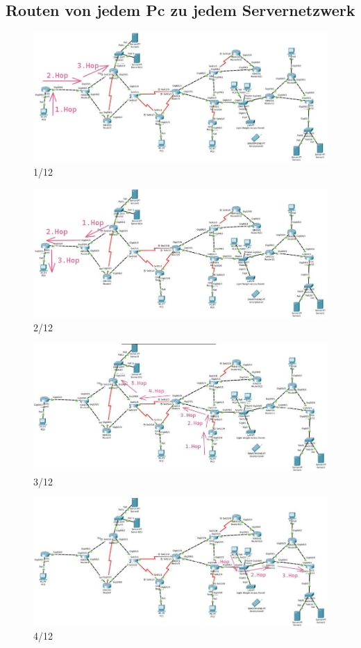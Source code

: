 \documentclass[a4paper]{article}
\begin{document}
\subsection{Routen von jedem Pc zu jedem Servernetzwerk}
\begin{figure}[h]
	\centering
	\includegraphics[scale=0.5]{1.jpg}
	\caption{1/12}
\end{figure}
\begin{figure}[h]
	\centering
	\includegraphics[scale=0.5]{2.jpg}
	\caption{2/12}
\end{figure}
\begin{figure}[h]
	\centering
	\includegraphics[scale=0.5]{3.jpg}
	\caption{3/12}
\end{figure}
\begin{figure}[h]
	\centering
	\includegraphics[scale=0.5]{4.jpg}
	\caption{4/12}
\end{figure}
\end{document}
